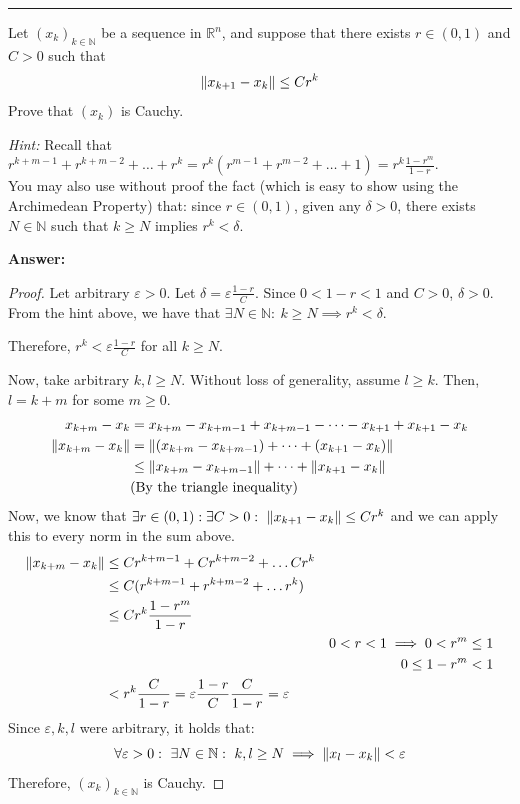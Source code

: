 \documentclass[11pt]{article}
\newcounter{problem}
\newenvironment{problem}{%
    \newpage
    \refstepcounter{problem}%
    \Needspace{7\baselineskip}%
    \par\vspace{0.7em}%
    \noindent\textcolor{courseblue}{\rule{\textwidth}{0.4pt}}%
    \par\vspace{0.5em}%
    \begin{list}{}{%
        \setlength{\leftmargin}{2.3em}%
        \setlength{\labelwidth}{1.8em}%
        \setlength{\labelsep}{0.5em}%
        \setlength{\topsep}{0pt}%
        \setlength{\partopsep}{0pt}%
    }%
    \item[{[\theproblem]}]
}{%
    \end{list}
    \par\vspace{0.5em}
}
\newenvironment{answer}{%
    \Needspace{4\baselineskip}%
    \par\vspace{0.35em}
    \noindent\textbf{Answer:}\par
}{%
    \par\vspace{0.25em}
}
\begin{document}
\begin{problem}
Let $(x_k)_{k\in \mathbb{N}}$ be a sequence in $\mathbb{R}^n$, and suppose that there exists $r \in (0, 1)$ and $C > 0$ such that
\[
    \norm{x_{k+1} - x_k} \leq Cr^k
\]    
Prove that $(x_k)$ is Cauchy.

\emph{Hint:} Recall that $r^{k+m-1} + r^{k+m-2} + \dots + r^k = r^k(r^{m-1} + r^{m-2} + \dots + 1) = r^k\frac{1-r^m}{1-r}$.\\
You may also use without proof the fact (which is easy to show using the Archimedean Property) that: since $r \in (0, 1)$, given any $\delta > 0$, there exists $N \in \mathbb{N}$ such that $k \geq N$ implies $r^k < \delta$.

\begin{answer}
    \begin{proof}
        Let arbitrary $\varepsilon > 0$. Let $\delta = \varepsilon\frac{1-r}{C}$. Since $0 < 1-r < 1$ and $C>0$,  $\delta > 0$. From the hint above, we have that $\exists N\in \mathbb{N}:\ k \geq N \implies r^k < \delta$.

        Therefore, $r^k < \varepsilon\frac{1-r}{C}$ for all $k \geq N$.


        Now, take arbitrary $k,l \geq N$. Without loss of generality, assume $l \geq k$. Then, $l = k + m$ for some $m \geq 0$.
        \begin{align*}
            x_{k+m} - x_k &= x_{k+m} - x_{k+m-1} + x_{k+m-1} - \dots - x_{k+1} + x_{k+1} - x_k\\
            \norm{x_{k+m} - x_k} &= \norm{(x_{k+m} - x_{k+m-1}) + \dots + (x_{k+1} - x_k)}\\
            &\leq\norm{x_{k+m} - x_{k+m-1}} + \dots + \norm{x_{k+1} - x_k}  \\ 
            & \text{(By the triangle inequality)}
        \end{align*}
        Now, we know that $\exists r \in (0,1): \exists C>0:\ \norm{x_{k+1} - x_k} \leq Cr^k$ and we can apply this to every norm in the sum above.
        \begin{align*}
            \norm{x_{k+m} - x_k} &\leq Cr^{k+m-1} + Cr^{k+m-2} + \dots Cr^{k}\\
            &\leq C(r^{k+m-1} + r^{k+m-2} + \dots r^{k})\\
            &\leq Cr^k\frac{1-r^m}{1-r}\\
            && 0 < r < 1 \implies 0 < r^m \leq 1\\ && 0 \leq1 - r^m < 1\\
            &< r^k\frac{C}{1-r} = \varepsilon\frac{1-r}{C}\frac{C}{1-r} = \varepsilon
        \end{align*}
        Since $\varepsilon,k,l$ were arbitrary, it holds that:
        \[
            \forall \varepsilon > 0:\ \exists N\in \mathbb{N}:\ k,l \geq N \implies \norm{x_l - x_k} < \varepsilon
        \]
        Therefore, $(x_k)_{k\in\mathbb{N}}$ is Cauchy.
    \end{proof}
\end{answer}
\end{problem}
\end{document}
